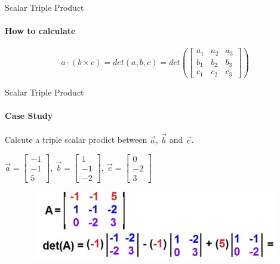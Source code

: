 \documentclass[aspectratio=169,notes]{beamer}
\begin{document}
\begin{frame}[c]{Scalar Triple Product}
\framesubtitle{How to calculate}
\Large
    \begin{equation*}
        a \cdot (b \times c) = det(a,b,c) = det(\begin{bmatrix}
        a_1 & a_2 & a_3 \\
        b_1 & b_2 & b_3 \\ 
        c_1 & c_2  & c_3 
        \end{bmatrix})
    \end{equation*}
\end{frame}

\begin{frame}[t]{Scalar Triple Product}
\framesubtitle{Case Study}
    Calcute a triple scalar prodict between $\vec{a}$, $\vec{b}$ and $\vec{c}$.

    $\vec{a} = \begin{bmatrix}-1\\-1\\5\end{bmatrix},\ \vec{b} = \begin{bmatrix}1\\-1\\-2\end{bmatrix},\ \vec{c} = \begin{bmatrix}0\\-2\\3\end{bmatrix}$

    \begin{figure}[H]
        \centering\includegraphics[height=3cm,width=1\textwidth,keepaspectratio]{triple_scalar_way.jpg}
        \label{fig:triple_scalar_way.jpg}
    \end{figure}
\end{frame}
\end{document}

